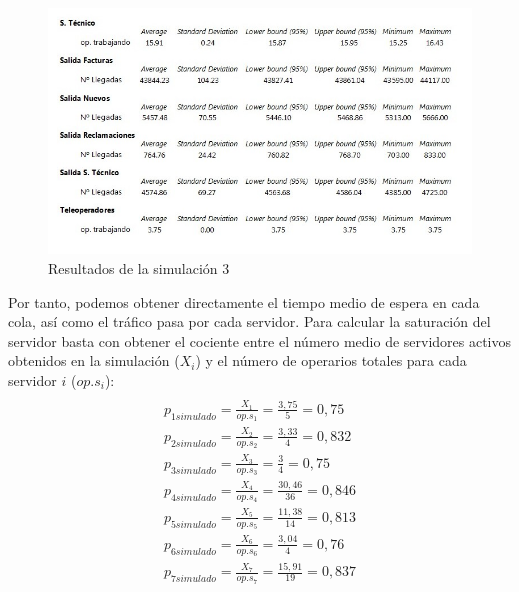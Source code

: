 \begin{figure}[H]
\begin{center}
\centering
  \includegraphics[width=1\textwidth]{./images/foto3}
  \caption{Resultados de la simulación 3}
  \label{fig: Resultados de la simulacion 3}
\end{center}
\end{figure}
Por tanto, podemos obtener directamente el tiempo medio de espera en cada cola, así como el tráfico pasa por cada servidor. Para calcular la saturación del servidor basta con obtener el cociente entre el número medio de servidores activos obtenidos en la simulación ($X_{i}$) y el número de operarios totales para cada servidor $i$ ($op.s_{i}$):
\begin{multline}\\
p_{1 simulado} = \frac{X_{1}}{op.s_{1}} = \frac{3,75}{5} = 0,75 \\
p_{2 simulado} = \frac{X_{2}}{op.s_{2}} = \frac{3,33}{4} = 0,832\\
p_{3 simulado} = \frac{X_{3}}{op.s_{3}} = \frac{3}{4} = 0,75\\
p_{4 simulado} = \frac{X_{4}}{op.s_{4}} = \frac{30,46}{36} = 0,846\\
p_{5 simulado} = \frac{X_{5}}{op.s_{5}} = \frac{11,38}{14} = 0,813\\
p_{6 simulado} = \frac{X_{6}}{op.s_{6}} = \frac{3,04}{4} = 0,76\\
p_{7 simulado} = \frac{X_{7}}{op.s_{7}} = \frac{15,91}{19} = 0,837\\
\end{multline}


